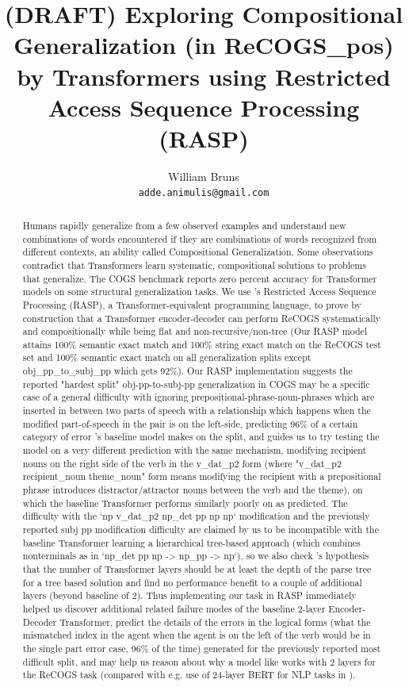 \documentclass[11pt]{article}
\title{(DRAFT) Exploring Compositional Generalization (in ReCOGS\_pos) by Transformers using Restricted Access Sequence Processing (RASP)}
\author{William Bruns \\
  \texttt{adde.animulis@gmail.com}
}
\begin{document}
\maketitle
\begin{abstract}
Humans rapidly generalize from a few observed examples and understand new combinations of words encountered if they are combinations of words recognized from different contexts, an ability called Compositional Generalization. Some observations contradict that Transformers learn systematic, compositional solutions to problems that generalize. The COGS benchmark \cite{KimLinzen2020} reports zero percent accuracy for Transformer models on some structural generalization tasks.
We use \cite{Weiss2021}'s Restricted Access Sequence Processing (RASP), a Transformer-equivalent programming language, to prove by construction that a Transformer encoder-decoder can perform ReCOGS \cite{Wu2023} systematically and compositionally while being flat and non-recursive/non-tree (Our RASP model attains 100\% semantic exact match and 100\% string exact match on the ReCOGS test set and 100\% semantic exact match on all generalization splits except obj\_pp\_to\_subj\_pp which gets 92\%). Our RASP implementation suggests the reported "hardest split" obj-pp-to-subj-pp generalization in COGS may be a specific case of a general difficulty with ignoring prepositional-phrase-noun-phrases which are inserted in between two parts of speech with a relationship which happens when the modified part-of-speech in the pair is on the left-side, predicting 96\% of a certain category of error \cite{Wu2023}'s baseline model makes on the split, and guides us to try testing the model on a very different prediction with the same mechanism, modifying recipient nouns on the right side of the verb in the v\_dat\_p2 form (where "v\_dat\_p2 recipient\_noun theme\_noun" form means modifying the recipient with a prepositional phrase introduces distractor/attractor nouns between the verb and the theme), on which the baseline Transformer performs similarly poorly on as predicted. The difficulty with the `np v\_dat\_p2 np\_det pp np np` modification and the previously reported subj pp modification difficulty are claimed by us to be incompatible with the baseline \cite{Wu2023} Transformer learning a hierarchical tree-based approach (which combines nonterminals as in `np\_det pp np -> np\_pp -> np`), so we also check \cite{Csordas2022}'s hypothesis that the number of Transformer layers should be at least the depth of the parse tree for a tree based solution and find no performance benefit to a couple of additional layers (beyond baseline of 2). Thus implementing our task in RASP immediately helped us discover additional related failure modes of the baseline 2-layer Encoder-Decoder Transformer, predict the details of the errors in the logical forms (what the mismatched index in the agent when the agent is on the left of the verb would be in the single part error case, 96\% of the time) generated for the previously reported most difficult split, and may help us reason about why a model like \cite{Wu2023} works with 2 layers for the ReCOGS task (compared with e.g. use of 24-layer BERT for NLP tasks in \cite{tenney2019bertrediscoversclassicalnlp}).
\end{abstract}
\end{document}
